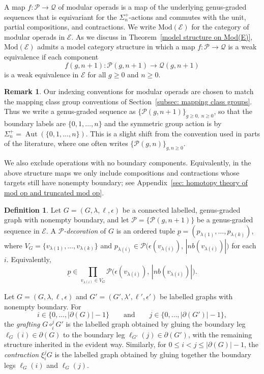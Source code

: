 \documentclass{amsart}
\newcommand{\bE}{\mathscr{E}}
\newcommand{\calQ}{\mathcal{Q}}
\newcommand{\calP}{\mathcal{P}}
\newcommand{\Mod}{\mathrm{Mod}}
\newcommand{\Aut}{\operatorname{Aut}}
\newcommand{\nb}{nb}
\theoremstyle{definition}
\newtheorem{definition}[theorem]{Definition}%
\newtheorem{remark}[theorem]{Remark}%
\numberwithin{equation}{section}
\begin{document}
A map $f:\calP\to\calQ$ of modular operads is a map of the underlying genus-graded sequences that is equivariant for the $\Sigma_n^+$-actions and commutes with the unit, partial compositions, and contractions. We write $\Mod(\bE)$ for the category of modular operads in $\bE$. As we discuss in Theorem~\ref{model structure on Mod(E)}, $\Mod(\bE)$ admits a model category structure in which a map $f:\calP\to\calQ$ is a weak equivalence if each component
\[
f(g,n+1):\calP(g,n+1)\longrightarrow \calQ(g,n+1)
\]
is a weak equivalence in $\bE$ for all $g\ge 0$ and $n\ge 0$.

\begin{remark}\label{rmk:indexing-modular-operads}
Our indexing conventions for modular operads are chosen to match the mapping class group conventions of Section~\ref{subsec: mapping class groups}. Thus we write a genus-graded sequence as $\{\calP(g,n+1)\}_{g\geq 0,\;n\geq 0}$, so that the boundary labels are $\{0,1,\ldots,n\}$ and the symmetric group action is by $\Sigma_n^+=\Aut(\{0,1,\ldots,n\})$. This is a slight shift from the convention used in parts of the literature, where one often writes $\{\calP(g,n)\}_{g,n\geq 0}$.

We also exclude operations with no boundary components. Equivalently, in the above structure maps we only include compositions and contractions whose targets still have nonempty boundary; see Appendix~\ref{sec: homotopy theory of mod op and truncated mod op}.
\end{remark}


\begin{definition}\label{def:decorated graph}
Let $G=(G,\lambda,\ell,\epsilon)$ be a connected labelled, genus-graded graph with nonempty boundary, and let $\calP=\{\calP(g,n+1)\}$ be a genus-graded sequence in $\bE$. A \emph{$\calP$-decoration} of $G$ is an ordered tuple 
$\underline{p}=(p_{\lambda(1)},\ldots,p_{\lambda(k)})$, where $V_G=\{v_{\lambda(1)},\ldots,v_{\lambda(k)}\}$ and 
$p_{\lambda(i)}\in \calP\bigl(\epsilon(v_{\lambda(i)}),\,|\nb(v_{\lambda(i)})|\bigr)$ for each $i$.
Equivalently,
\[
\underline{p}\in \prod_{v_{\lambda(i)}\in V_G}\calP\bigl(\epsilon(v_{\lambda(i)}),\,|\nb(v_{\lambda(i)})|\bigr).
\]
\end{definition}

Let $G=(G,\lambda,\ell,\epsilon)$ and $G'=(G',\lambda',\ell',\epsilon')$ be labelled graphs with nonempty boundary. For
\[
i\in\{0,\ldots,|\partial(G)|-1\}
\qquad\text{and}\qquad
j\in\{0,\ldots,|\partial(G')|-1\},
\]
the \emph{grafting} $G\circ_i^j G'$ is the labelled graph obtained by gluing the boundary leg $\ell_G(i)\in\partial(G)$ to the boundary leg $\ell_{G'}(j)\in\partial(G')$, with the remaining structure inherited in the evident way. Similarly, for $0\le i<j\le |\partial(G)|-1$, the \emph{contraction} $\xi_i^j G$ is the labelled graph obtained by gluing together the boundary legs $\ell_G(i)$ and $\ell_G(j)$.
\end{document}
